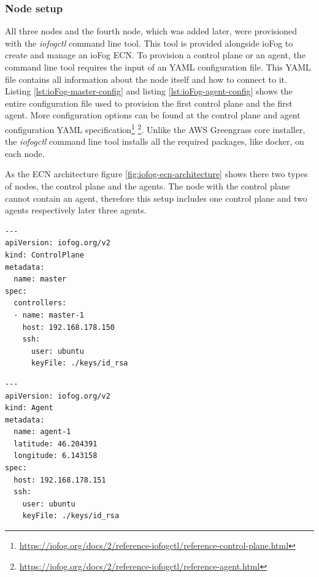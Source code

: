 \subsubsection*{Node setup}
All three nodes and the fourth node, which was added later, were provisioned with the \textit{iofogctl} command line tool. This tool is provided alongside ioFog to create and manage an ioFog \gls{ECN}. To provision a control plane or an agent, the command line tool requires the input of an YAML configuration file. This YAML file contains all information about the node itself and how to connect to it. Listing \ref{lst:ioFog-master-config} and listing \ref{lst:ioFog-agent-config} shows the entire configuration file used to provision the first control plane and the first agent. More configuration options can be found at the control plane and agent configuration YAML specification\footnote{\url{https://iofog.org/docs/2/reference-iofogctl/reference-control-plane.html}} \footnote{\url{https://iofog.org/docs/2/reference-iofogctl/reference-agent.html}}. Unlike the AWS Greengrass core installer, the \textit{iofogctl} command line tool installs all the required packages, like docker, on each node.

\bigskip
As the \gls{ECN} architecture figure \ref{fig:iofog-ecn-architecture} shows there two types of nodes, the control plane and the agents. The node with the control plane cannot contain an agent, therefore this setup includes one control plane and two agents respectively later three agents.

\noindent\begin{minipage}{.45\textwidth}
\begin{lstlisting}[caption={Control plane provisioning configuration.},label={lst:ioFog-master-config}]
---
apiVersion: iofog.org/v2
kind: ControlPlane
metadata:
  name: master
spec:
  controllers:
  - name: master-1
    host: 192.168.178.150
    ssh:
      user: ubuntu
      keyFile: ./keys/id_rsa
\end{lstlisting}
\end{minipage}\hfill
\begin{minipage}{.45\textwidth}
\begin{lstlisting}[caption={Agent one provisioning configuration.},label={lst:ioFog-agent-config}]
---
apiVersion: iofog.org/v2
kind: Agent
metadata:
  name: agent-1
  latitude: 46.204391
  longitude: 6.143158
spec:
  host: 192.168.178.151
  ssh:
    user: ubuntu
    keyFile: ./keys/id_rsa
\end{lstlisting}
\end{minipage}



